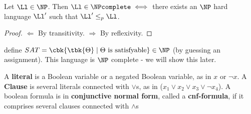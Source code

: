 \begin{blueBox}
	\begin{thm}
		Let $\Ll\in \NP$. Then
		$\Ll\in \NPcomplete \iff$ there exists an $\NP$ hard language $\Ll'$ such that $\Ll'\leq_p \Ll$.
	\end{thm}
\end{blueBox}
\begin{proof}
	$\Leftarrow$ By transitivity. $\Rightarrow$ By reflexivity.
\end{proof}
\begin{example}
	define $SAT = \cbk{\tbk{\Theta}\mid \Theta\text{ is satisfyable}}\in \NP$ (by guessing an assignment). This language is $\NP$ complete - we will show this later.
\end{example}
\begin{yellowBox}
\begin{defn}
	A \textbf{literal} is a Boolean variable or a negated Boolean variable, as in $x$ or $\neg x$.
	A \textbf{Clause} is several literals connected with $\vee$s, as in ($x_1 \vee x_2\vee x_3 \vee \neg x_4$). A boolean formula is in \textbf{conjunctive normal form}, called a \textbf{cnf-formula}, if it comprises several clauses connected with $\wedge$s
\end{defn}
\end{yellowBox}
